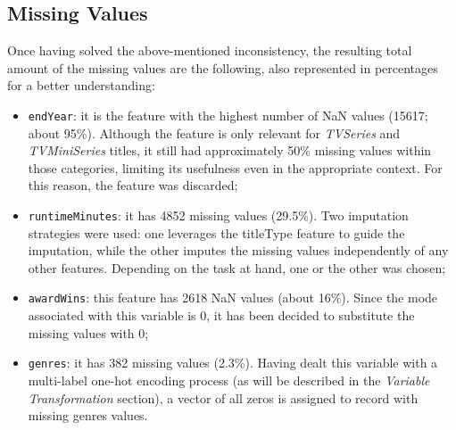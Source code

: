 \subsection{Missing Values}
Once having solved the above-mentioned inconsistency, the resulting total amount of the missing values are the following, 
also represented in percentages for a better understanding:
\begin{itemize}
    \item \texttt{endYear}: it is the feature with the highest number of NaN values (15617; about 95\%).
    Although the feature is only relevant for \textit{TVSeries} and \textit{TVMiniSeries} titles, it still
    had approximately 50\% missing values within those categories, limiting its usefulness even in the
    appropriate context. For this reason, the feature was discarded;
    
    \item \texttt{runtimeMinutes}: it has 4852 missing values (29.5\%).
    Two imputation strategies were used: one leverages the titleType feature to guide
    the imputation,
    while the other imputes the missing values independently of any other features.
    Depending on the task at hand, one or the other was chosen;
    
    \item \texttt{awardWins}: this feature has 2618 NaN values (about 16\%).
    Since the mode associated with this variable is 0, it has been decided to substitute the missing
    values with 0;

    \item \texttt{genres}: it has 382 missing values (2.3\%). Having dealt this variable with a
    multi-label one-hot encoding process (as will be described in the \textit{Variable Transformation}
    section), a vector of all zeros is assigned to record with missing genres values.
\end{itemize}



